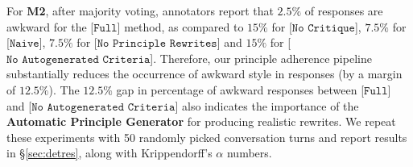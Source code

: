 \documentclass[11pt]{article}
\newcommand{\ananjan}[1]{\ifthenelse{\boolean{showcomments}}{\textcolor{green}{[#1 —ananjan]}}{}}
\begin{document}
For \textbf{M2}, 
after majority voting, annotators report that $2.5\%$ of responses are awkward for the [$\texttt{Full}$] method, as compared to $15\%$ for [$\texttt{No Critique}$], $7.5\%$ for [$\texttt{Naive}$], $7.5\%$ for [$\texttt{No Principle Rewrites}$] and $15\%$ for [$\texttt{No Autogenerated Criteria}$]. Therefore, our principle adherence pipeline substantially reduces the occurrence of awkward style in responses (by a margin of $12.5\%$). The $12.5\%$ gap in percentage of awkward responses between [$\texttt{Full}$] and  [$\texttt{No Autogenerated Criteria}$] also indicates the importance of the \textbf{Automatic Principle Generator} for producing realistic rewrites. We repeat these experiments with 50 randomly picked conversation turns and report results in \S\ref{sec:detres}, along with Krippendorff's $\alpha$ numbers. 



\end{document}
